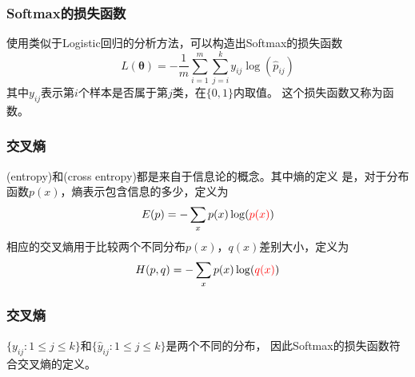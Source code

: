 \documentclass[14pt]{beamer}
\renewcommand{\vec}[1]{\bm{#1}}
\newcommand{\Vt}{\vec{\theta}}
\let\emph\relax %
\begin{document}
\begin{frame}
  \frametitle{Softmax的损失函数}
  使用类似于Logistic回归的分析方法，可以构造出Softmax的损失函数
  \begin{equation}
    L(\Vt)=-\frac{1}{m}\sum_{i=1}^m\sum_{j=i}^k y_{ij}\log(\hat{p}_{ij})
  \end{equation}
  其中$y_{ij}$表示第$i$个样本是否属于第$j$类，在$\{0,1\}$内取值。
  这个损失函数又称为\emph{交叉熵}函数。
\end{frame}

\begin{frame}
  \frametitle{交叉熵}
  \emph{熵}(entropy)和\emph{交叉熵}(cross entropy)都是来自于信息论的概念。其中熵的定义
  是，对于分布函数$p(x)$，熵表示包含信息的多少，定义为
  \begin{equation}
    E(p)=-\sum_x p(x)\log({\color{red}p(x)})
  \end{equation}
  相应的交叉熵用于比较两个不同分布$p(x)$，$q(x)$差别大小，定义为
  \begin{equation}
    H(p,q)=-\sum_x p(x)\log({\color{red}q(x)})
  \end{equation}
\end{frame}

\begin{frame}
  \frametitle{交叉熵}
  $\{y_{ij}:1\leq j\leq k\}$和$\{\hat{y}_{ij}:1\leq j\leq k\}$是两个不同的分布，
  因此Softmax的损失函数符合交叉熵的定义。

  

\end{frame}
\end{document}
